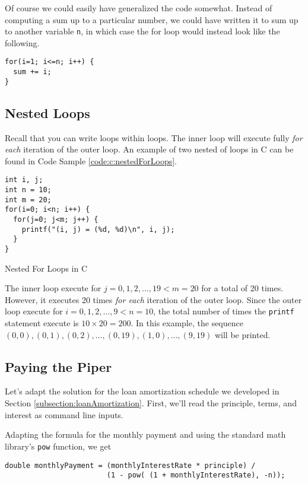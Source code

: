 Of course we could easily have generalized the code somewhat.  Instead of computing
a sum up to a particular number, we could have written it to sum up to another
variable \texttt{n}, in which case the for loop would instead look like the
following.

\begin{verbatim}
for(i=1; i<=n; i++) {
  sum += i;
}
\end{verbatim}

\subsection{Nested Loops}

Recall that you can write loops within loops.  The inner loop will execute fully 
\emph{for each} iteration of the outer loop.  An example of two nested of
loops in C can be found in Code Sample \ref{code:c:nestedForLoops}.

\begin{listing}[H]
\begin{verbatim}
int i, j;
int n = 10;
int m = 20;
for(i=0; i<n; i++) {
  for(j=0; j<m; j++) {
    printf("(i, j) = (%d, %d)\n", i, j);
  }
}
\end{verbatim}
  \caption{Nested For Loops in C}
  \label{code:c:nestedForLoops}
\end{listing}

The inner loop execute for $j = 0, 1, 2, \ldots, 19 < m = 20$ for a total
of 20 times.  However, it executes 20 times \emph{for each} iteration of
the outer loop.  Since the outer loop execute for $i = 0, 1, 2, \ldots, 9 < n = 10$, 
the total number of times the \texttt{printf} statement execute is
$10 \times 20 = 200$.  In this example, the sequence $(0, 0), (0, 1), (0, 2), \ldots, (0,19), (1, 0), \ldots, (9, 19)$
will be printed.

\subsection{Paying the Piper}

Let's adapt the solution for the loan amortization schedule we developed in 
Section \ref{subsection:loanAmortization}.  First, we'll read the principle, 
terms, and interest as command line inputs.

Adapting the formula for the monthly payment and using the standard
math library's \texttt{pow} function, we get

\begin{verbatim}
double monthlyPayment = (monthlyInterestRate * principle) / 
                        (1 - pow( (1 + monthlyInterestRate), -n));
\end{verbatim}

